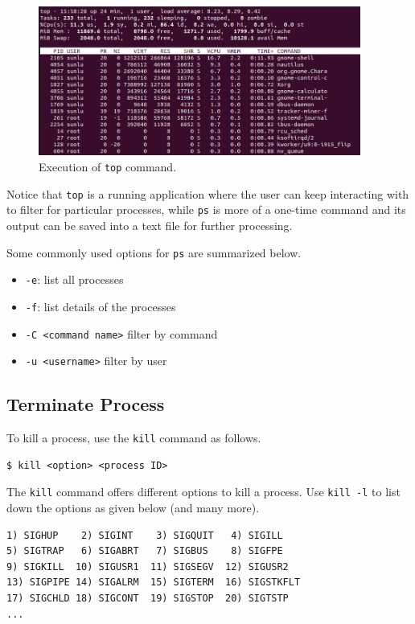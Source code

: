 \begin{figure}[!htb]
	\centering
	\includegraphics[width=300pt]{chapters/part-1/figures/topcommand.png}
	\caption{Execution of \texttt{top} command.} \label{ch:pm:fig:topcommand}
\end{figure}

Notice that \verb|top| is a running application where the user can keep interacting with to filter for particular processes, while \verb|ps| is more of a one-time command and its output can be saved into a text file for further processing.

Some commonly used options for \verb|ps| are summarized below.
\begin{itemize}
	\item \verb|-e|: list all processes
	\item \verb|-f|: list details of the processes
	\item \verb|-C <command name>| filter by command
	\item \verb|-u <username>| filter by user
\end{itemize}

\subsection{Terminate Process}

To kill a process, use the \verb|kill| command as follows.
\begin{lstlisting}
$ kill <option> <process ID>
\end{lstlisting}

The \verb|kill| command offers different options to kill a process. Use \verb|kill -l| to list down the options as given below (and many more).
\begin{lstlisting}
1) SIGHUP    2) SIGINT    3) SIGQUIT   4) SIGILL
5) SIGTRAP   6) SIGABRT   7) SIGBUS    8) SIGFPE
9) SIGKILL  10) SIGUSR1  11) SIGSEGV  12) SIGUSR2
13) SIGPIPE 14) SIGALRM	 15) SIGTERM  16) SIGSTKFLT
17) SIGCHLD 18) SIGCONT	 19) SIGSTOP  20) SIGTSTP
...
\end{lstlisting}

